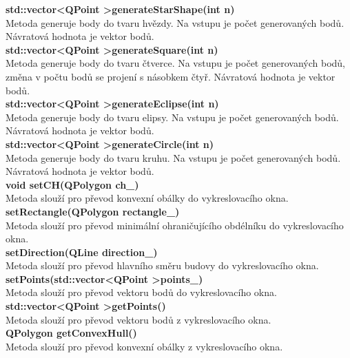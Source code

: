\documentclass[a4paper, 12pt]{article}
\begin{document}
\textbf{std::vector\textless QPoint \textgreater generateStarShape(int n)}\\
Metoda generuje body do tvaru hvězdy. Na vstupu je počet generovaných bodů. Návratová hodnota je vektor bodů.\\

\textbf{std::vector\textless QPoint \textgreater generateSquare(int n)}\\
Metoda generuje body do tvaru čtverce. Na vstupu je počet generovaných bodů, změna v počtu bodů se projení s násobkem čtyř. Návratová hodnota je vektor bodů.\\

\textbf{std::vector\textless QPoint \textgreater generateEclipse(int n)}\\
Metoda generuje body do tvaru elipsy. Na vstupu je počet generovaných bodů. Návratová hodnota je vektor bodů.\\

\textbf{std::vector\textless QPoint \textgreater generateCircle(int n)}\\
Metoda generuje body do tvaru kruhu. Na vstupu je počet generovaných bodů. Návratová hodnota je vektor bodů.\\

\textbf{void setCH(QPolygon ch\_)}\\
Metoda slouží pro převod konvexní obálky do vykreslovacího okna.\\

\textbf{setRectangle(QPolygon rectangle\_)}\\
Metoda slouží pro převod minimální ohraničujícího obdélníku do vykreslovacího okna.\\

\textbf{setDirection(QLine direction\_)}\\
Metoda slouží pro převod hlavního směru budovy do vykreslovacího okna.\\

\textbf{setPoints(std::vector\textless QPoint \textgreater points\_)}\\
Metoda slouží pro převod vektoru bodů do vykreslovacího okna.\\

\textbf{std::vector\textless QPoint \textgreater getPoints()}\\
Metoda slouží pro převod vektoru bodů z vykreslovacího okna.\\

\textbf{QPolygon getConvexHull()}\\
Metoda slouží pro převod konvexní obálky z vykreslovacího okna.
\end{document}
